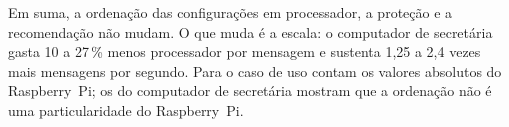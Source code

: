 Em suma, a ordenação das configurações em processador, a proteção e a
recomendação não mudam. O que muda é a escala: o computador de secretária gasta
10 a 27\,\% menos processador por mensagem e sustenta 1,25 a 2,4 vezes mais
mensagens por segundo. Para o caso de uso contam os valores absolutos do
Raspberry~Pi; os do computador de secretária mostram que a ordenação não é uma
particularidade do Raspberry~Pi.
